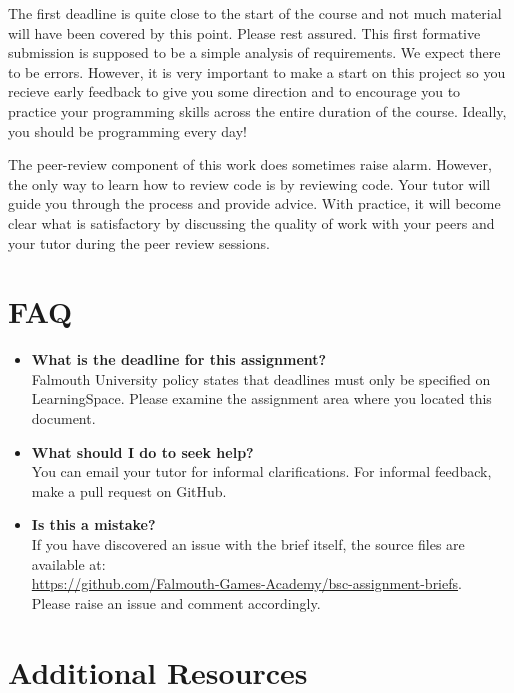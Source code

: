 \documentclass{../fal_assignment}
\begin{document}
The first deadline is quite close to the start of the course and not much material will have been covered by this point. Please rest assured. This first formative submission is supposed to be a simple analysis of requirements. We expect there to be errors. However, it is very important to make a start on this project so you recieve early feedback to give you some direction and to encourage you to practice your programming skills across the entire duration of the course. Ideally, you should be programming every day!

The peer-review component of this work does sometimes raise alarm. However, the only way to learn how to review code is by reviewing code. Your tutor will guide you through the process and provide advice. With practice, it will become clear what is satisfactory by discussing the quality of work with your peers and your tutor during the peer review sessions. 

\section*{FAQ}

\begin{itemize}
	\item 	\textbf{What is the deadline for this assignment?} \\ 
    		Falmouth University policy states that deadlines must only be specified on LearningSpace. Please examine the assignment area where you located this document.
    		
	\item 	\textbf{What should I do to seek help?} \\ 
    		You can email your tutor for informal clarifications. For informal feedback, make a pull request on GitHub. 
    		
    	\item 	\textbf{Is this a mistake?} \\ 	
    		If you have discovered an issue with the brief itself, the source files are available at: \\
    		\url{https://github.com/Falmouth-Games-Academy/bsc-assignment-briefs}.\\
    		 Please raise an issue and comment accordingly.
\end{itemize}

\section*{Additional Resources}
\end{document}
